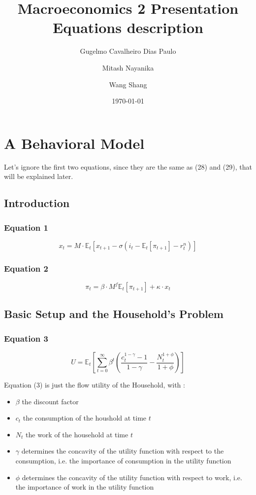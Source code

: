 \documentclass{article}
\title{Macroeconomics 2 Presentation \\ Equations description}
\author{Gugelmo Cavalheiro Dias Paulo \\ \and Mitash Nayanika \\ \and Wang Shang}
\date{\today}
\begin{document}
\maketitle

\pagebreak
\tableofcontents
\pagebreak

\section{A Behavioral Model}
Let's ignore the first two equations, since they are the same as (28) and (29), that will be explained later.

\subsection{Introduction}

\subsubsection*{Equation 1}
\begin{equation}
    x_{t}=M\cdot\mathbb{E}_{t}\left[ x_{t+1} -\sigma (i_{t}-\mathbb{E}_t\left[\pi_{t+1}\right]-r^{n}_{t})\right]
\end{equation}

\subsubsection*{Equation 2}
\begin{equation}
    \pi_{t}=\beta\cdot M^{f} \mathbb{E}_t\left[\pi_{t+1}\right]+\kappa\cdot x_{t}
\end{equation}

\subsection{Basic Setup and the Household’s Problem}

\subsubsection*{Equation 3}
\begin{equation}
    U = \mathbb{E}_t \left[ \sum_{t=0}^{\infty} \beta^{t}\left(\frac{c_{t}^{1-\gamma}-1}{1-\gamma} - \frac{N_{t}^{1+\phi}}{1+\phi}\right)\right]
\end{equation}

Equation (3) is just the flow utility of the Household, with : 
\begin{itemize}
    \item $\beta$ the discount factor
    \item $c_{t}$ the consumption of the houshold at time $t$
    \item $N_{t}$ the work of the household at time $t$
    \item $\gamma$ determines the concavity of the utility function with respect to the consumption, i.e. the importance of consumption in the utility function
    \item $\phi$ determines the concavity of the utility function with respect to work, i.e. the importance of work in the utility function
\end{itemize}
\end{document}
